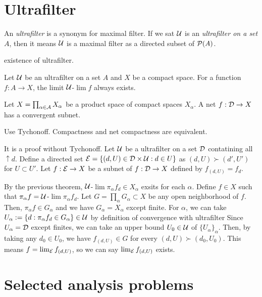 \documentclass[12pt]{article}
\begin{document}
\section{Ultrafilter}
\begin{defn}
An \emph{ultrafilter} is a synonym for maximal filter.
If we sat $\mathcal{U}$ is an \emph{ultrafilter on a set} $A$, then it means $\mathcal{U}$ is a maximal filter as a directed subset of $\mathcal{P}(A)$.
\end{defn}
existence of ultrafilter.
\begin{thm}
Let $\mathcal{U}$ be an ultrafilter on a set $A$ and $X$ be a compact space.
For a function $f:A\to X$, the limit $\mathcal{U}$-$\lim f$ always exists.
\end{thm}

\begin{thm}
Let $X=\prod_{\alpha\in\mathcal{A}}X_\alpha$ be a product space of compact spaces $X_\alpha$.
A net $f:\mathcal{D}\to X$ has a convergent subnet.
\end{thm}
\begin{pf}[1]
Use Tychonoff.
Compactness and net compactness are equivalent.
\end{pf}
\begin{pf}[2]
It is a proof without Tychonoff.
Let $\mathcal{U}$ be a ultrafilter on a set $\mathcal{D}$ contatining all $\uparrow d$.
Define a directed set $\mathcal{E}=\{(d,U)\in\mathcal{D}\times\mathcal{U}:d\in U\}$ as $(d,U)\succ(d',U')$ for $U\subset U'$.
Let $f:\mathcal{E}\to X$ be a subnet of $f:\mathcal{D}\to X$ defined by $f_{(d,U)}=f_d$.

By the previous theorem, $\mathcal{U}$-$\lim\pi_\alpha f_d\in X_\alpha$ exsits for each $\alpha$.
Define $f\in X$ such that $\pi_\alpha f=\mathcal{U}$-$\lim\pi_\alpha f_d$.
Let $G=\prod_\alpha G_\alpha\subset X$ be any open neighborhood of $f$.
Then, $\pi_\alpha f\in G_\alpha$ and we have $G_\alpha=X_\alpha$ except finite.
For $\alpha$, we can take $U_\alpha:=\{d:\pi_\alpha f_d\in G_\alpha\}\in\mathcal{U}$ by definition of convergence with ultrafilter
Since $U_\alpha=\mathcal{D}$ except finites, we can take an upper bound $U_0\in\mathcal{U}$ of $\{U_\alpha\}_\alpha$.
Then, by taking any $d_0\in U_0$, we have $f_{(d,U)}\in G$ for every $(d,U)\succ(d_0,U_0)$.
This means $f=\lim_{\mathcal{E}} f_{(d,U)}$, so we can say $\lim_{\mathcal{E}} f_{(d,U)}$ exists.
\end{pf}







\section{Selected analysis problems}
\end{document}
